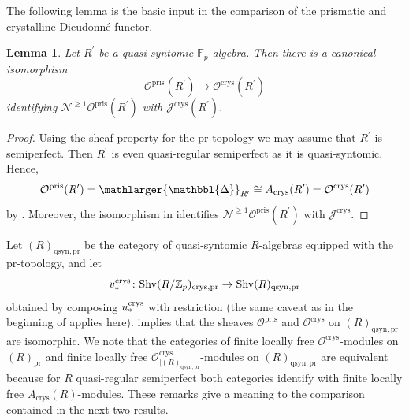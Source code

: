 \documentclass{amsart}
\newcommand{\prism}{{\mathlarger{\mathbbl{\Delta}}}}
\theoremstyle{plain}
\newtheorem{lemma}[theorem]{Lemma}
\theoremstyle{definition}
\newcommand{\crys}{\mathrm{crys}}
\newcommand{\pris}{\mathrm{pris}}
\newcommand{\Z}{\mathbb{Z}}
\newcommand{\red}[1]{{\color{black} #1}}
\newcommand{\blue}[1]{{\color{black}#1}}
\begin{document}
The following lemma is the basic input in the comparison of the prismatic and crystalline Dieudonn\'e functor.

\begin{lemma}
  \label{sec:comp-with-cryst-lemma-comparison-of-prismatic-and-crystalline-pushforward}
  \red{Let $R^\prime$ be a quasi-syntomic $\mathbb{F}_p$-algebra.} Then there is a canonical isomorphism
  $$
  \mathcal{O}^\pris(R^\prime)\to \mathcal{O}^{\crys}(R^\prime)
  $$
  identifying $\mathcal{N}^{\geq 1}\mathcal{O}^\pris(R^\prime)$ with $\mathcal{J}^{\mathrm{crys}}(R^\prime)$.
\end{lemma}


\begin{proof}
  Using the sheaf property for the $\mathrm{pr}$-topology we may assume that $R^\prime$ is semiperfect. Then $R^\prime$ is even quasi-regular semiperfect as it is quasi-syntomic. Hence,
  $$
  \mathcal{O}^\pris(R^\prime)=\prism_{R^\prime}\cong A_{\mathrm{crys}}(R^\prime)=\mathcal{O}^{\crys}(R^\prime)
  $$
  by . Moreover, the isomorphism in  identifies $\mathcal{N}^{\geq 1}\mathcal{O}^\pris(R^\prime)$ with $\mathcal{J}^{\mathrm{crys}}$.
\end{proof}
Let $(R)_{\mathrm{qsyn},\mathrm{pr}}$ be the category of quasi-syntomic $R$-algebras equipped with the $\mathrm{pr}$-topology, and \blue{let
$$
v^{\rm crys}_\ast \colon \mathrm{Shv}(R/\Z_p)_{\crys,\mathrm{pr}}\to \mathrm{Shv}(R)_{\mathrm{qsyn}, \mathrm{pr}}
$$ obtained by composing $u^{\rm crys}_\ast$ with restriction (the same caveat as in the beginning of \Cref{sec:abstr-divid-dieud} applies here)}.  implies that the sheaves $\mathcal{O}^\pris$ and $\mathcal{O}^\crys$ on $(R)_{\mathrm{qsyn},\mathrm{pr}}$ are isomorphic. We note that the categories of finite locally free $\mathcal{O}^{\mathrm{crys}}$-modules on $(R)_{\mathrm{pr}}$ and finite locally free $\mathcal{O}^{\mathrm{crys}}_{|(R)_{\mathrm{qsyn},\mathrm{pr}}}$-modules on $(R)_{\mathrm{qsyn},\mathrm{pr}}$ are equivalent because for $R$ quasi-regular semiperfect both categories identify with finite locally free $A_{\mathrm{crys}}(R)$-modules. 
These remarks give a meaning to the comparison contained in the next two results. 
\end{document}
